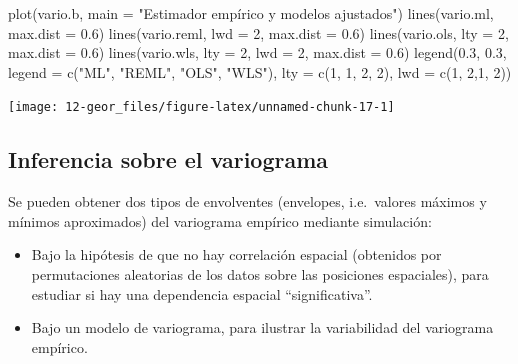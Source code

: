 \documentclass[
  spanish,
]{book}
\newenvironment{Shaded}{\begin{snugshade}}{\end{snugshade}}
\newcommand{\AttributeTok}[1]{\textcolor[rgb]{0.77,0.63,0.00}{#1}}
\newcommand{\DecValTok}[1]{\textcolor[rgb]{0.00,0.00,0.81}{#1}}
\newcommand{\FloatTok}[1]{\textcolor[rgb]{0.00,0.00,0.81}{#1}}
\newcommand{\FunctionTok}[1]{\textcolor[rgb]{0.00,0.00,0.00}{#1}}
\newcommand{\NormalTok}[1]{#1}
\newcommand{\StringTok}[1]{\textcolor[rgb]{0.31,0.60,0.02}{#1}}
\theoremstyle{break}
\theoremstyle{definition}
\theoremstyle{definition}
\theoremstyle{definition}
\theoremstyle{definition}
\theoremstyle{remark}
\begin{document}
\begin{Shaded}
\begin{Highlighting}[]
\FunctionTok{plot}\NormalTok{(vario.b, }\AttributeTok{main =} \StringTok{"Estimador empírico y modelos ajustados"}\NormalTok{)}
\FunctionTok{lines}\NormalTok{(vario.ml, }\AttributeTok{max.dist =} \FloatTok{0.6}\NormalTok{)}
\FunctionTok{lines}\NormalTok{(vario.reml, }\AttributeTok{lwd =} \DecValTok{2}\NormalTok{, }\AttributeTok{max.dist =} \FloatTok{0.6}\NormalTok{)}
\FunctionTok{lines}\NormalTok{(vario.ols, }\AttributeTok{lty =} \DecValTok{2}\NormalTok{, }\AttributeTok{max.dist =} \FloatTok{0.6}\NormalTok{)}
\FunctionTok{lines}\NormalTok{(vario.wls, }\AttributeTok{lty =} \DecValTok{2}\NormalTok{, }\AttributeTok{lwd =} \DecValTok{2}\NormalTok{, }\AttributeTok{max.dist =} \FloatTok{0.6}\NormalTok{)}
\FunctionTok{legend}\NormalTok{(}\FloatTok{0.3}\NormalTok{, }\FloatTok{0.3}\NormalTok{, }\AttributeTok{legend =} \FunctionTok{c}\NormalTok{(}\StringTok{"ML"}\NormalTok{, }\StringTok{"REML"}\NormalTok{, }\StringTok{"OLS"}\NormalTok{, }\StringTok{"WLS"}\NormalTok{), }\AttributeTok{lty =} \FunctionTok{c}\NormalTok{(}\DecValTok{1}\NormalTok{, }\DecValTok{1}\NormalTok{, }\DecValTok{2}\NormalTok{, }\DecValTok{2}\NormalTok{), }\AttributeTok{lwd =} \FunctionTok{c}\NormalTok{(}\DecValTok{1}\NormalTok{, }\DecValTok{2}\NormalTok{,}\DecValTok{1}\NormalTok{, }\DecValTok{2}\NormalTok{)) }
\end{Highlighting}
\end{Shaded}

\begin{center}\texttt{[image: 12-geor\_files/figure-latex/unnamed-chunk-17-1]} \end{center}

\hypertarget{inferencia-sobre-el-variograma}{%
\subsection{Inferencia sobre el variograma}\label{inferencia-sobre-el-variograma}}

Se pueden obtener dos tipos de envolventes (envelopes, i.e.~valores
máximos y mínimos aproximados) del variograma empírico mediante
simulación:

\begin{itemize}
\item
  Bajo la hipótesis de que no hay correlación espacial (obtenidos por
  permutaciones aleatorias de los datos sobre las posiciones
  espaciales), para estudiar si hay una dependencia
  espacial ``significativa''.
\item
  Bajo un modelo de variograma, para ilustrar la variabilidad del
  variograma empírico.
\end{itemize}
\end{document}
